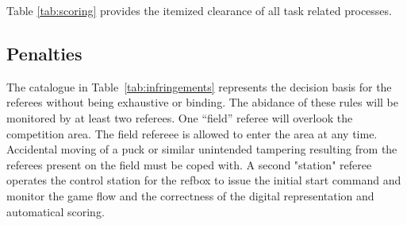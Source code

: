 \documentclass[12pt,twoside]{article}
\begin{document}
Table \ref{tab:scoring} provides the itemized clearance of all task
related processes.




\subsection{Penalties}

The catalogue in Table~\ref{tab:infringements} represents the decision
basis for the referees without being exhaustive or binding.
%
The abidance of these rules will be monitored by at least two
referees.  One ``field'' referee will overlook the competition
area. The field refereee is allowed to enter the area at any
time. Accidental moving of a puck or similar unintended tampering
resulting from the referees present on the field must be coped with. A
second "station" referee operates the control station for the refbox
to issue the initial start command and monitor the game flow and the
correctness of the digital representation and automatical scoring.
\end{document}
